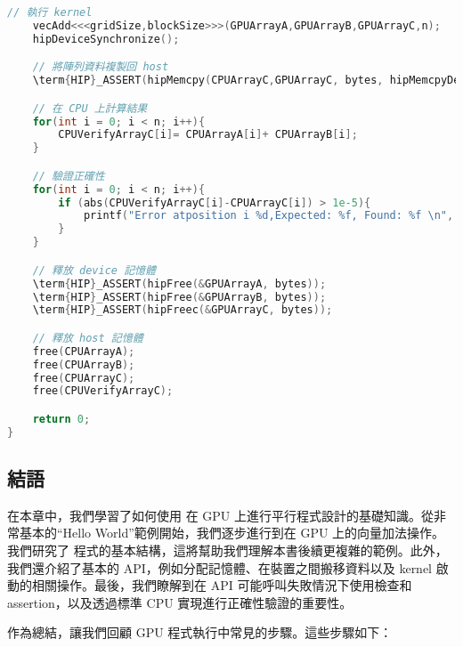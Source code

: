 \begin{lstlisting}[language=C, caption={完整的VectorAdd範例程式碼}, label={8th:example}]
    // 執行 kernel
    vecAdd<<<gridSize,blockSize>>>(GPUArrayA,GPUArrayB,GPUArrayC,n);
    hipDeviceSynchronize();

    // 將陣列資料複製回 host
    \term{HIP}_ASSERT(hipMemcpy(CPUArrayC,GPUArrayC, bytes, hipMemcpyDeviceToHost));

    // 在 CPU 上計算結果
    for(int i = 0; i < n; i++){
        CPUVerifyArrayC[i]= CPUArrayA[i]+ CPUArrayB[i];
    }

    // 驗證正確性
    for(int i = 0; i < n; i++){
        if (abs(CPUVerifyArrayC[i]-CPUArrayC[i]) > 1e-5){
            printf("Error atposition i %d,Expected: %f, Found: %f \n", i, CPUVerifyArrayC[i], CPUArrayC[i]);
        }
    }

    // 釋放 device 記憶體
    \term{HIP}_ASSERT(hipFree(&GPUArrayA, bytes));
    \term{HIP}_ASSERT(hipFree(&GPUArrayB, bytes));
    \term{HIP}_ASSERT(hipFreec(&GPUArrayC, bytes));

    // 釋放 host 記憶體
    free(CPUArrayA);
    free(CPUArrayB);
    free(CPUArrayC);
    free(CPUVerifyArrayC);

    return 0;
}
\end{lstlisting}

\subsection{結語}
在本章中，我們學習了如何使用  在 GPU 上進行平行程式設計的基礎知識。從非常基本的“Hello World”範例開始，我們逐步進行到在 GPU 上的向量加法操作。我們研究了  程式的基本結構，這將幫助我們理解本書後續更複雜的範例。此外，我們還介紹了基本的 API，例如分配記憶體、在裝置之間搬移資料以及 kernel 啟動的相關操作。最後，我們瞭解到在 API 可能呼叫失敗情況下使用檢查和assertion，以及透過標準 CPU 實現進行正確性驗證的重要性。

作為總結，讓我們回顧 GPU 程式執行中常見的步驟。這些步驟如下：

